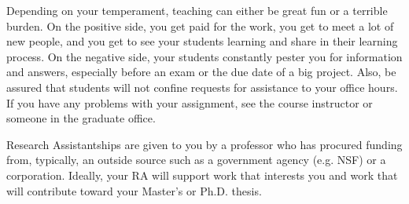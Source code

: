 Depending on your temperament, teaching can either be great fun or a terrible burden. On the positive side, you get paid for the work, you get to meet a lot of new people, and you get to see your students learning and share in their learning process. On the negative side, your students constantly pester you for information and answers, especially before an exam or the due date of a big project. Also, be assured that students will not confine requests for assistance to your office hours. If you have any problems with your assignment, see the course instructor or someone in the graduate office.

Research Assistantships are given to you by a professor who has procured funding from, typically, an outside source such as a government agency (e.g. NSF) or a corporation. Ideally, your RA will support work that interests you and work that will contribute toward your Master's or Ph.D. thesis.

